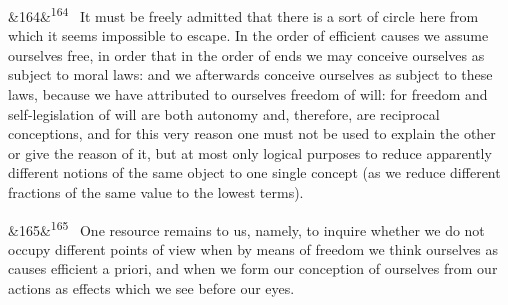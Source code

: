 \documentclass[12pt]{article}
\newcommand{\para}[1][]{\par\noindent\ifx&#1&\else\textsuperscript{\footnotesize #1}~\fi}
\begin{document}
\para[164] It must be freely admitted that there is a sort of circle here from which it seems impossible to escape. In the order of efficient causes we assume ourselves free, in order that in the order of ends we may conceive ourselves as subject to moral laws: and we afterwards conceive ourselves as subject to these laws, because we have attributed to ourselves freedom of will: for freedom and self-legislation of will are both autonomy and, therefore, are reciprocal conceptions, and for this very reason one must not be used to explain the other or give the reason of it, but at most only logical purposes to reduce apparently different notions of the same object to one single concept (as we reduce different fractions of the same value to the lowest terms).

\para[165] One resource remains to us, namely, to inquire whether we do not occupy different points of view when by means of freedom we think ourselves as causes efficient a priori, and when we form our conception of ourselves from our actions as effects which we see before our eyes.
\end{document}
